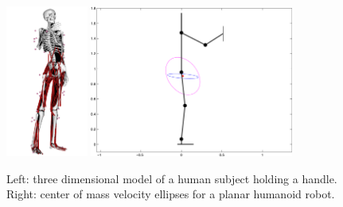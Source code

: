 \documentclass[final,5p,twocolumn]{elsarticle}
\begin{document}

\begin{figure}
	\begin{center}
		\includegraphics[height=5cm]{images/skeleton_v1.png}
		\includegraphics[height=5cm]{images/ellipses.pdf}
		\caption{Left: three dimensional model of a human subject holding a handle. Right: center of mass velocity ellipses for a planar humanoid robot.}
		\label{fig:skeleton_ellipses}
	\end{center}
\end{figure}

\end{document}
